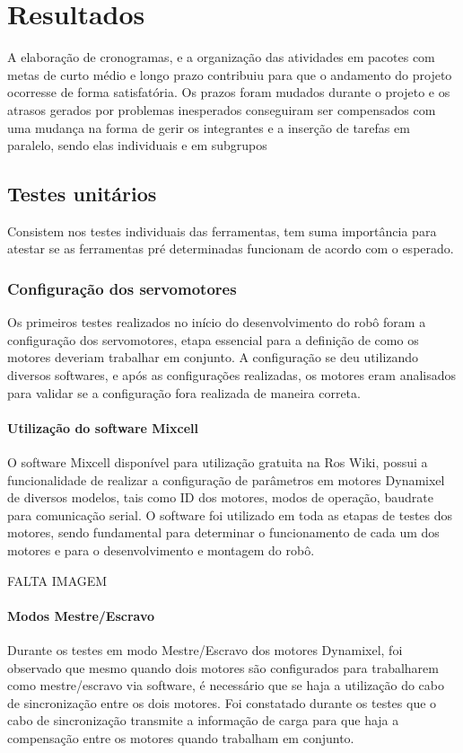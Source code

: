 \chapter{Resultados}
\label{chap:result}
A elaboração de cronogramas, e a organização das atividades em pacotes com metas de curto médio e longo prazo contribuiu para que o andamento do projeto ocorresse de forma satisfatória. Os prazos foram mudados  durante o projeto e os atrasos gerados por problemas inesperados conseguiram ser compensados com uma mudança na forma de gerir os integrantes e a inserção de tarefas em paralelo, sendo elas individuais e em subgrupos


\section{Testes unitários}
\label{sec:testu}
Consistem nos testes individuais das ferramentas, tem suma importância para atestar se as ferramentas pré determinadas funcionam de acordo com o esperado.


\subsection{Configuração dos servomotores}
Os primeiros testes realizados no início do desenvolvimento do robô foram a configuração dos servomotores, etapa essencial para a definição de como os motores deveriam trabalhar em conjunto. A configuração se deu utilizando diversos softwares, e após as configurações realizadas, os motores eram analisados para validar se a configuração fora realizada de maneira correta.

\subsubsection{Utilização do software Mixcell}
O software Mixcell disponível para utilização gratuita na Ros Wiki, possui a funcionalidade de realizar a configuração de parâmetros em motores Dynamixel de diversos modelos, tais como ID dos motores, modos de operação, baudrate para comunicação serial. O software foi utilizado em toda as etapas de testes dos motores, sendo fundamental para determinar o funcionamento de cada um dos motores e para o desenvolvimento e montagem do robô.  

FALTA IMAGEM
\subsubsection{Modos Mestre/Escravo}
Durante os testes em modo Mestre/Escravo dos motores Dynamixel, foi observado que mesmo quando dois motores são configurados para trabalharem como mestre/escravo via software, é necessário que se haja a utilização do cabo de sincronização entre os dois motores. Foi constatado durante os testes que o cabo de sincronização transmite a informação de carga para que haja a compensação entre os motores quando trabalham em conjunto. 

